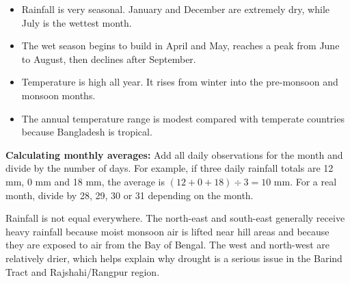 \documentclass[11pt,a4paper]{article}
\begin{document}

\begin{itemize}
  \item Rainfall is very seasonal. January and December are extremely dry, while July is the wettest month.
  \item The wet season begins to build in April and May, reaches a peak from June to August, then declines after September.
  \item Temperature is high all year. It rises from winter into the pre-monsoon and monsoon months.
  \item The annual temperature range is modest compared with temperate countries because Bangladesh is tropical.
\end{itemize}

\begin{skillbox}
\textbf{Calculating monthly averages:} Add all daily observations for the month and divide by the number of days. For example, if three daily rainfall totals are 12 mm, 0 mm and 18 mm, the average is $(12+0+18)\div3=10$ mm. For a real month, divide by 28, 29, 30 or 31 depending on the month.
\end{skillbox}

Rainfall is not equal everywhere. The north-east and south-east generally receive heavy rainfall because moist monsoon air is lifted near hill areas and because they are exposed to air from the Bay of Bengal. The west and north-west are relatively drier, which helps explain why drought is a serious issue in the Barind Tract and Rajshahi/Rangpur region.

\begin{center}
\end{center}
\end{document}

